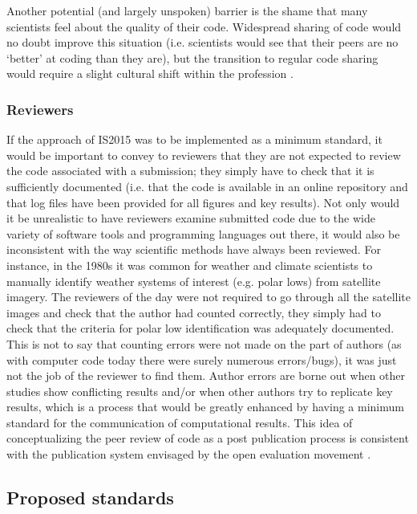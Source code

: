 Another potential (and largely unspoken) barrier is the shame that many scientists feel about the quality of their code. Widespread sharing of code would no doubt improve this situation (i.e. scientists would see that their peers are no `better' at coding than they are), but the transition to regular code sharing would require a slight cultural shift within the profession \citep{Barnes2010}.

\subsubsection{Reviewers}

If the approach of IS2015 was to be implemented as a minimum standard, it would be important to convey to reviewers that they are not expected to review the code associated with a submission; they simply have to check that it is sufficiently documented (i.e. that the code is available in an online repository and that log files have been provided for all figures and key results). Not only would it be unrealistic to have reviewers examine submitted code due to the wide variety of software tools and programming languages out there, it would also be inconsistent with the way scientific methods have always been reviewed. For instance, in the 1980s it was common for weather and climate scientists to manually identify weather systems of interest (e.g. polar lows) from satellite imagery. The reviewers of the day were not required to go through all the satellite images and check that the author had counted correctly, they simply had to check that the criteria for polar low identification was adequately documented. This is not to say that counting errors were not made on the part of authors (as with computer code today there were surely numerous errors/bugs), it was just not the job of the reviewer to find them. Author errors are borne out when other studies show conflicting results and/or when other authors try to replicate key results, which is a process that would be greatly enhanced by having a minimum standard for the communication of computational results. This idea of conceptualizing the peer review of code as a post publication process is consistent with the publication system envisaged by the open evaluation movement \citep[e.g.][]{Kriegeskorte2012}. 
  
\subsection{Proposed standards}

